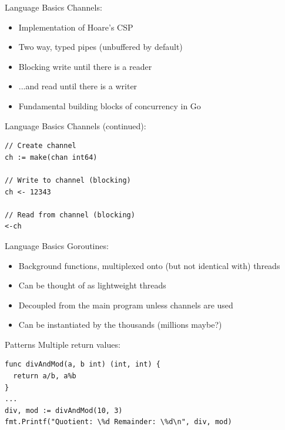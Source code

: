 \documentclass[pdf,xcolor=dvipsnames,noparindent]{beamer}
\begin{document}
\begin{frame}[fragile]{Language Basics}
  Channels:
  \pause
  \begin{itemize}
  \item Implementation of Hoare's CSP
    \pause
  \item Two way, typed pipes (unbuffered by default)
    \pause
  \item Blocking write until there is a reader
    \pause
  \item ...and read until there is a writer
    \pause
  \item Fundamental building blocks of concurrency in Go
  \end{itemize}
  
\end{frame}

\begin{frame}[fragile]{Language Basics}
  Channels (continued):
  \pause
\begin{verbatim}
// Create channel
ch := make(chan int64)

// Write to channel (blocking)
ch <- 12343

// Read from channel (blocking)
<-ch
\end{verbatim}
\end{frame}

\begin{frame}[fragile]{Language Basics}
  Goroutines:
  \pause
  \begin{itemize}
  \item Background functions, multiplexed onto (but not identical with) threads
    \pause
  \item Can be thought of as lightweight threads
    \pause
  \item Decoupled from the main program unless channels are used
    \pause
  \item Can be instantiated by the thousands (millions maybe?)
  \end{itemize}
  
\end{frame}

\begin{frame}[fragile]{Patterns}
  Multiple return values:
  \pause
\begin{verbatim}
func divAndMod(a, b int) (int, int) {
  return a/b, a%b
}
...
div, mod := divAndMod(10, 3)
fmt.Printf("Quotient: \%d Remainder: \%d\n", div, mod)
\end{verbatim}
  
\end{frame}
\end{document}
